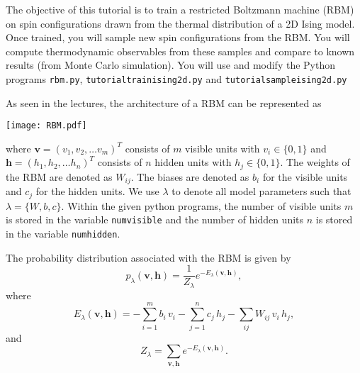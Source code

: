 \documentclass[letterpaper]{scrartcl}
\begin{document}

\vspace{-3cm}


\date{August 30, 2019}

\maketitle

The objective of this tutorial is to train a restricted Boltzmann machine (RBM) on spin configurations drawn from the thermal distribution
of a 2D Ising model.  Once trained, you will sample new spin configurations from the RBM.
You will compute thermodynamic observables from these samples and compare to known results (from Monte Carlo simulation).
You will use and modify the Python programs
\texttt{rbm.py}, \texttt{tutorial{\textunderscore}train{\textunderscore}ising2d.py} and
\texttt{tutorial{\textunderscore}sample{\textunderscore}ising2d.py} %

As seen in the lectures, the architecture of a RBM can be represented as
\begin{center}
\texttt{[image: RBM.pdf]}
\end{center}
where $\mathbf{v} = \left(v_1, v_2, \ldots v_m\right)^T$ consists of $m$ visible units with $v_i \in \{0,1\}$ and $\mathbf{h} = \left(h_1, h_2, \ldots h_n\right)^T$ consists of $n$ hidden units with $h_j \in \{0,1\}$.
The weights of the RBM are denoted as $W_{ij}$.
The biases are denoted as $b_i$ for the visible units and $c_j$ for the hidden units.
We use $\lambda$ to denote all model parameters such that $\lambda = \{ W, b, c \}$.
Within the given python programs, the number of visible units $m$ is stored in the variable \texttt{num{\textunderscore}visible}
and the number of hidden units $n$ is stored in the variable \texttt{num{\textunderscore}hidden}.

The probability distribution associated with the RBM is given by
\begin{equation*}
p_\lambda(\mathbf{v}, \mathbf{h}) = \frac{1}{Z_\lambda} e^{-E_\lambda (\mathbf{v}, \mathbf{h})},
\end{equation*}
where
\begin{equation*}
E_\lambda (\mathbf{v}, \mathbf{h}) = -\sum_{i=1}^m b_i \, v_i -\sum_{j=1}^n c_j\,  h_j - \sum_{ij} W_{ij} \, v_i \, h_j ,
\end{equation*}
and
\begin{equation*}
Z_\lambda = \sum_{\mathbf{v}, \mathbf{h}} e^{-E_\lambda (\mathbf{v}, \mathbf{h})}.
\end{equation*}
\end{document}
